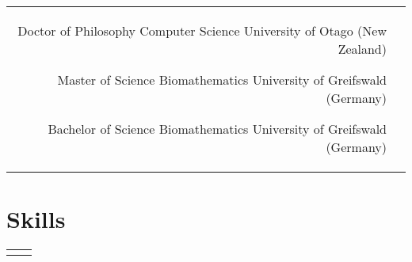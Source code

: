 \documentclass[10pt]{article} %
\begin{document}
\begin{paracol}{2}


\begin{supertabular}{rp{7cm}} %

	{Doctor of Philosophy}
	{}
	{Computer Science}
	{University of Otago (New Zealand)}

	{Master of Science}
	{}
	{Biomathematics}
	{University of Greifswald (Germany)}

	{Bachelor of Science} %
	{} %
	{Biomathematics} %
	{University of Greifswald (Germany)} %

	

\end{supertabular}



\section{Skills} 





\begin{supertabular}{rp{7cm}} %
	
	
	

\end{supertabular}
\end{paracol}
\end{document}
